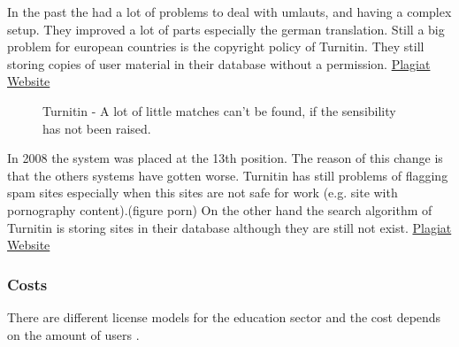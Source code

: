 In the past the had a lot of problems to deal with umlauts, and having a complex setup. They improved a lot of parts especially the german translation. Still a big problem for european countries is the copyright policy of Turnitin. They still storing copies of user material in their database without a permission. \href{http://plagiat.htw-berlin.de/software-en/2010-2/s10-01-turnitin/}{Plagiat Website}

 \begin{figure}[!h]
  \centering
  \caption{Turnitin - A lot of little matches can't be found, if the sensibility has not been raised.}
  \label{fig:Turnitin overview}
\end{figure}
 
In 2008 the system was placed at the 13th position. The reason of this change is that the others systems have gotten worse. Turnitin has still problems of flagging spam sites especially when this sites are not safe for work (e.g. site with pornography content).(figure porn) On the other hand the search algorithm of Turnitin is storing sites in their database although they are still not exist.
\href{http://plagiat.htw-berlin.de/software-en/2010-2/s10-01-turnitin/}{Plagiat Website}


\subsubsection*{Costs}
There are different license models for the education sector and the cost depends on the amount of users . 

